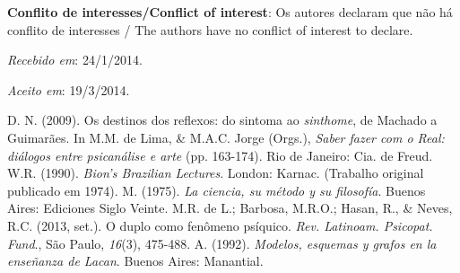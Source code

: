 \begin{multicols}{2}
\medskip\par\noindent
{}\textbf{Conflito de interesses\fshyp{}Conflict of interest}:\allowbreak{} Os autores declaram que não há conflito de interesses \fshyp{} The authors have no conflict of interest to declare.\allowbreak{}
\medskip\par\noindent
\footnotesize{\textit{Recebido em}: 24/1/2014.} \par \noindent
\footnotesize{\textit{Aceito em}: 19/3/2014.} \begin{scieloReferencesContainer}[Referências]
\allowbreak{} D.\allowbreak{} N.\allowbreak{} (\allowbreak{}2009)\allowbreak{}.\allowbreak{} Os destinos dos reflexos:\allowbreak{} do sintoma ao \textit{sinthome},\allowbreak{} de Machado a Guimarães.\allowbreak{} In M.\allowbreak{}M.\allowbreak{} de Lima,\allowbreak{} \&\allowbreak{\allowbreak{}\allowbreak{}}\allowbreak{} M.\allowbreak{}A.\allowbreak{}C.\allowbreak{} Jorge (\allowbreak{}Orgs.\allowbreak{})\allowbreak{},\allowbreak{} \textit{Saber fazer com o Real:\allowbreak{} diálogos entre psicanálise e arte} (\allowbreak{}pp.\allowbreak{} 163-\allowbreak{}174)\allowbreak{}.\allowbreak{} Rio de Janeiro:\allowbreak{} Cia.\allowbreak{} de Freud.\allowbreak{}
\allowbreak{} W.\allowbreak{}R.\allowbreak{} (\allowbreak{}1990)\allowbreak{}.\allowbreak{} \textit{Bion’s Brazilian Lectures}.\allowbreak{} London:\allowbreak{} Karnac.\allowbreak{} (\allowbreak{}Trabalho original publicado em 1974)\allowbreak{}.\allowbreak{}
\allowbreak{} M.\allowbreak{} (\allowbreak{}1975)\allowbreak{}.\allowbreak{} \textit{La ciencia,\allowbreak{} su método y su filosofía}.\allowbreak{} Buenos Aires:\allowbreak{} Ediciones Siglo Veinte.\allowbreak{}
\allowbreak{} M.\allowbreak{}R.\allowbreak{} de L.\allowbreak{}; Barbosa,\allowbreak{} M.\allowbreak{}R.\allowbreak{}O.\allowbreak{}; Hasan,\allowbreak{} R.\allowbreak{},\allowbreak{} \&\allowbreak{\allowbreak{}\allowbreak{}}\allowbreak{} Neves,\allowbreak{} R.\allowbreak{}C.\allowbreak{} (\allowbreak{}2013,\allowbreak{} set.\allowbreak{})\allowbreak{}.\allowbreak{} O duplo como fenômeno psíquico.\allowbreak{} \textit{Rev.\allowbreak{} Latinoam.\allowbreak{} Psicopat.\allowbreak{} Fund}.\allowbreak{},\allowbreak{} São Paulo,\allowbreak{} \textit{16}(\allowbreak{}3)\allowbreak{},\allowbreak{} 475-\allowbreak{}488.\allowbreak{}
\allowbreak{} A.\allowbreak{} (\allowbreak{}1992)\allowbreak{}.\allowbreak{} \textit{Modelos,\allowbreak{} esquemas y grafos en la enseñanza de Lacan}.\allowbreak{} Buenos Aires:\allowbreak{} Manantial.\allowbreak{}

\end{scieloReferencesContainer}
\end{multicols}
